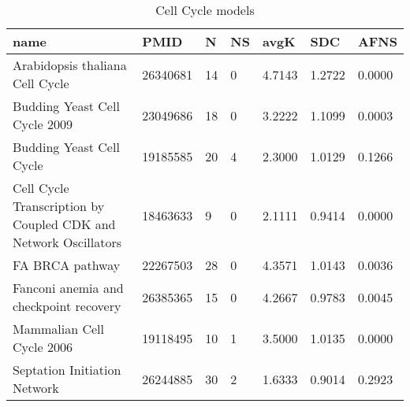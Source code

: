 \begin{table}
\centering
\caption{Cell Cycle models}
\label{tab:Cell_Cycle}
\begin{tabular}{|p{180pt}||p{40pt}|p{25pt}|p{25pt}|p{40pt}|p{25pt}|p{25pt}|}
\toprule
name & PMID &N &NS & avgK &SDC & AFNS \\
\midrule
Arabidopsis thaliana Cell Cycle & 26340681 & 14 & 0 & 4.7143 & 1.2722 & 0.0000 \\
Budding Yeast Cell Cycle 2009 & 23049686 & 18 & 0 & 3.2222 & 1.1099 & 0.0003 \\
Budding Yeast Cell Cycle & 19185585 & 20 & 4 & 2.3000 & 1.0129 & 0.1266 \\
Cell Cycle Transcription by Coupled CDK and Network Oscillators & 18463633 &9 & 0 & 2.1111 & 0.9414 & 0.0000 \\
FA BRCA pathway & 22267503 & 28 & 0 & 4.3571 & 1.0143 & 0.0036 \\
Fanconi anemia and checkpoint recovery & 26385365 & 15 & 0 & 4.2667 & 0.9783 & 0.0045 \\
Mammalian Cell Cycle 2006 & 19118495 & 10 & 1 & 3.5000 & 1.0135 & 0.0000 \\
Septation Initiation Network & 26244885 & 30 & 2 & 1.6333 & 0.9014 & 0.2923 \\
\bottomrule
\end{tabular}
\end{table}
